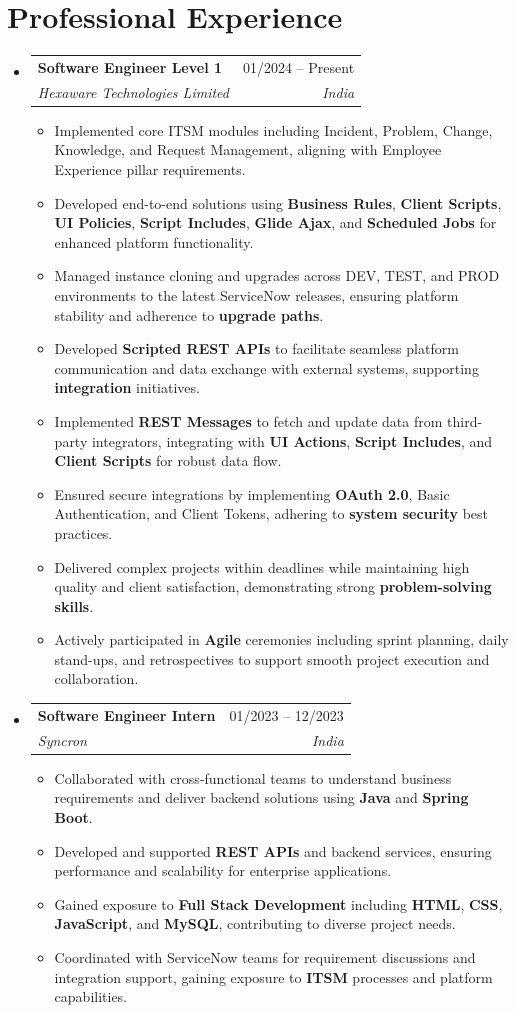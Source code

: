 \documentclass[letterpaper,11pt]{article}
\makeatletter
\newcommand{\resumeItem}[1]{
  \item\small{
    {#1 \vspace{-2pt}}
  }
}
\newcommand{\resumeSubheading}[4]{
  \vspace{-2pt}\item
    \begin{tabular*}{0.97\textwidth}[t]{l@{\extracolsep{\fill}}r}
      \textbf{#1} & #2 \\
      \textit{\small#3} & \textit{\small #4} \\
    \end{tabular*}\vspace{-7pt}
}
\newcommand{\resumeSubHeadingListStart}{\begin{itemize}[leftmargin=0.15in, label={}]}
\newcommand{\resumeSubHeadingListEnd}{\end{itemize}}
\newcommand{\resumeItemListStart}{\begin{itemize}}
\newcommand{\resumeItemListEnd}{\end{itemize}\vspace{-5pt}}
\makeatother
\begin{document}
\section{Professional Experience}
\resumeSubHeadingListStart
    \resumeSubheading
      {Software Engineer Level 1}{01/2024 – Present}
      {Hexaware Technologies Limited}{India}
      \resumeItemListStart
        \resumeItem{Implemented core ITSM modules including Incident, Problem, Change, Knowledge, and Request Management, aligning with Employee Experience pillar requirements.}
        \resumeItem{Developed end-to-end solutions using \textbf{Business Rules}, \textbf{Client Scripts}, \textbf{UI Policies}, \textbf{Script Includes}, \textbf{Glide Ajax}, and \textbf{Scheduled Jobs} for enhanced platform functionality.}
        \resumeItem{Managed instance cloning and upgrades across DEV, TEST, and PROD environments to the latest ServiceNow releases, ensuring platform stability and adherence to \textbf{upgrade paths}.}
        \resumeItem{Developed \textbf{Scripted REST APIs} to facilitate seamless platform communication and data exchange with external systems, supporting \textbf{integration} initiatives.}
        \resumeItem{Implemented \textbf{REST Messages} to fetch and update data from third-party integrators, integrating with \textbf{UI Actions}, \textbf{Script Includes}, and \textbf{Client Scripts} for robust data flow.}
        \resumeItem{Ensured secure integrations by implementing \textbf{OAuth 2.0}, Basic Authentication, and Client Tokens, adhering to \textbf{system security} best practices.}
        \resumeItem{Delivered complex projects within deadlines while maintaining high quality and client satisfaction, demonstrating strong \textbf{problem-solving skills}.}
        \resumeItem{Actively participated in \textbf{Agile} ceremonies including sprint planning, daily stand-ups, and retrospectives to support smooth project execution and collaboration.}
      \resumeItemListEnd
    \resumeSubheading
      {Software Engineer Intern}{01/2023 – 12/2023}
      {Syncron}{India}
      \resumeItemListStart
        \resumeItem{Collaborated with cross-functional teams to understand business requirements and deliver backend solutions using \textbf{Java} and \textbf{Spring Boot}.}
        \resumeItem{Developed and supported \textbf{REST APIs} and backend services, ensuring performance and scalability for enterprise applications.}
        \resumeItem{Gained exposure to \textbf{Full Stack Development} including \textbf{HTML}, \textbf{CSS}, \textbf{JavaScript}, and \textbf{MySQL}, contributing to diverse project needs.}
        \resumeItem{Coordinated with ServiceNow teams for requirement discussions and integration support, gaining exposure to \textbf{ITSM} processes and platform capabilities.}
      \resumeItemListEnd
\resumeSubHeadingListEnd
\end{document}
